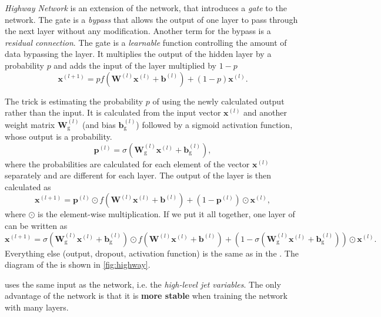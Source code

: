 \emph{Highway Network} \cite{highway} is an extension of the \fc network, that introduces a \emph{gate} to the network.
The gate is a \emph{bypass} that allows the output of one layer to pass through the next layer without any modification.
Another term for the bypass is a \emph{residual connection}.
The gate is a \emph{learnable} function controlling the amount of data bypassing the layer.
It multiplies the output of the hidden layer by a probability $p$ and adds the input of the layer multiplied by $1 - p$
\begin{equation}
    \pmb{x}^{(l + 1)} = p f(\pmb{W}^{(l)} \pmb{x}^{(l)} + \pmb{b}^{(l)}) + (1 - p) \pmb{x}^{(l)} . 
\end{equation}

The trick is estimating the probability $p$ of using the newly calculated output rather than the input.
It is calculated from the input vector $\pmb{x}^{(l)}$ and another weight matrix $\pmb{W}^{(l)}_{\text{g}}$ (and bias $\pmb{b}^{(l)}_{\text{g}}$) followed by a sigmoid activation function, whose output is a probability.
\begin{equation}
    \pmb{p}^{(l)} = \sigma(\pmb{W}^{(l)}_{\text{g}} \pmb{x}^{(l)} + \pmb{b}^{(l)}_{\text{g}}),
\end{equation}
where the probabilities are calculated for each element of the vector $\pmb{x}^{(l)}$ separately and are different for each layer.
The output of the \highway layer is then calculated as 
\begin{equation}
    \pmb{x}^{(l + 1)} = \pmb{p}^{(l)} \odot f(\pmb{W}^{(l)} \pmb{x}^{(l)} + \pmb{b}^{(l)}) + (1 - \pmb{p}^{(l)}) \odot \pmb{x}^{(l)} ,
\end{equation}
where $\odot$ is the element-wise multiplication.
If we put it all together, one layer of \highway can be written as
\begin{equation}
    \pmb{x}^{(l + 1)} = \sigma(\pmb{W}^{(l)}_{\text{g}} \pmb{x}^{(l)} + \pmb{b}^{(l)}_{\text{g}}) \odot f(\pmb{W}^{(l)} \pmb{x}^{(l)} + \pmb{b}^{(l)}) + (1 - \sigma(\pmb{W}^{(l)}_{\text{g}} \pmb{x}^{(l)} + \pmb{b}^{(l)}_{\text{g}})) \odot \pmb{x}^{(l)}.
\end{equation}
Everything else (output, dropout, activation function) is the same as in the \fc.
The diagram of the \highway is shown in \cref{fig:highway}.

\highway uses the same input as the \fc network, i.e. the \emph{high-level jet variables}.
The only advantage of the \highway network is that it is \textbf{more stable} when training the network with many layers.


